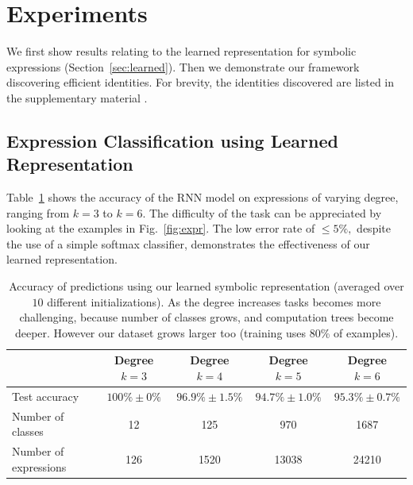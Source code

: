 \documentclass{article} %
\newcommand{\fig}[1]{Fig.~\ref{fig:#1}}
\newcommand{\tab}[1]{Table~\ref{tab:#1}}
\newcommand{\secc}[1]{Section~\ref{sec:#1}}
\begin{document}
\vspace{-1mm}
\section{Experiments}
\vspace{-2mm} 
We first show results relating to the learned representation for
symbolic expressions (\secc{learned}). Then we demonstrate our
framework discovering efficient identities. For brevity, the
identities discovered are listed in the supplementary material \cite{arxiv}. 

\vspace{-1mm}
\subsection{Expression Classification using Learned Representation}
\vspace{-1mm}
\tab{classify} shows the accuracy of the RNN model on expressions of
varying degree, ranging from $k=3$ to $k=6$. The difficulty of the
task can be appreciated by looking at the examples in \fig{expr}. The
low error rate of $\leq 5\%,$ despite the use of a simple softmax
classifier, demonstrates the effectiveness of our learned representation. 
\begin{table}[h!]
  \centering
 \vspace{-2mm}
  \scriptsize
  \begin{tabular}{lcccc}
    \hline
                           & Degree $k=3$      &  Degree $k=4$          & Degree $k=5$    & Degree $k=6$  \\
    \hline
    Test accuracy          & $100\% \pm 0\%$ &   $96.9\% \pm 1.5\%$ &  $94.7\% \pm 1.0\%$     &    $95.3\% \pm 0.7\%$ \\
    Number of classes      &           12    &            125       &      970        &     1687      \\
    Number of expressions &  126 &  1520 & 13038 & 24210 \\
 \end{tabular}
  \caption{Accuracy of predictions using our learned
    symbolic representation (averaged over $10$ different initializations). As the degree increases tasks becomes more challenging, 
  because number of classes grows, and computation trees become
  deeper. However our dataset grows larger too (training uses 80\% of
  examples).}
\label{tab:classify}
\end{table}

\vspace{-4mm}
\end{document}
